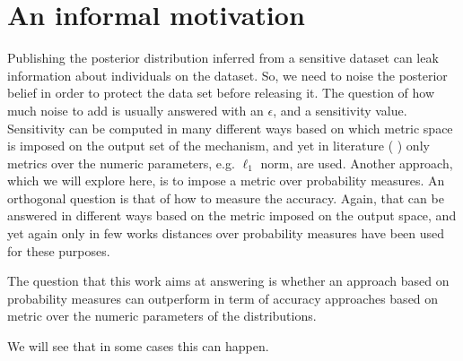 \documentclass[sigconf, anonymous]{acmart}
\begin{document}
% 
\section{An informal motivation}
\label{sec_intro}
Publishing the posterior distribution inferred from a sensitive dataset can
leak information about individuals on the dataset.
So, we need to noise the posterior belief in order to
protect the data set before releasing it. The question of how much noise to add
is usually answered with an $\epsilon$, and a sensitivity value.
Sensitivity can be computed in many different ways based on which metric space
is imposed on the output set of the mechanism, and yet in literature (\cite{zhang2016differential,xiao2012bayesian} )
only metrics over the numeric parameters, e.g. $\ell_1$ norm, are used.
Another approach, which we will explore here, is to impose a metric over probability measures.
An orthogonal question is that of how to measure the accuracy. Again,
that can be answered in different ways based on the metric imposed on the output space, and yet again
only in few works 
distances over probability measures have been used for these purposes.


The question that this work aims at answering is whether
an approach based on probability measures can outperform
in term of accuracy approaches based on metric over
the numeric parameters of the distributions.

We will see that in some cases this can happen.
\end{document}
